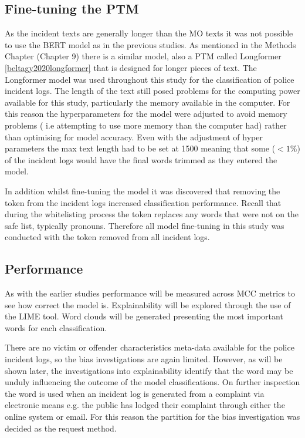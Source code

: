 \subsection{Fine-tuning the PTM} As the incident texts are generally longer than the MO texts it was not possible to use the BERT model as in the previous studies. As mentioned in the Methods Chapter (Chapter 9) there is a similar model, also a PTM called Longformer \ref{beltagy2020longformer}  that is designed for longer pieces of text. The Longformer model was used throughout this study for the classification of police incident logs. The length of the text still posed problems for the computing power available for this study, particularly the memory available in the computer. For this reason the hyperparameters for the model were adjusted to avoid memory problems ( i.e attempting to use more memory than the computer had) rather than optimising for model accuracy. Even with the adjustment of hyper parameters the max text length had to be set at 1500 meaning that some ($<1\%$) of the incident logs would have the final words trimmed as they entered the model.

In addition whilst fine-tuning the model it was discovered that removing the  token from the incident logs increased classification performance. Recall that during the whitelisting process the  token replaces any words that were not on the safe list, typically pronouns. Therefore all model fine-tuning in this study was conducted with the  token removed from all incident logs. 

\subsection{Performance} As with the earlier studies performance will be measured across MCC metrics to see how correct the model is. Explainability will be explored through the use of the LIME tool.  Word clouds will be generated presenting the most important words for each classification. 

There are no victim or offender characteristics meta-data  available for the police incident logs, so the bias investigations are again limited. However, as will be shown later,  the investigations into explainability identify that the word  may be unduly influencing the outcome of the model classifications. On further inspection the word  is used when an incident log is generated from a complaint via electronic means e.g. the public has lodged their complaint through either the online system or email. For this reason the partition for the bias investigation was decided as the request method. 

